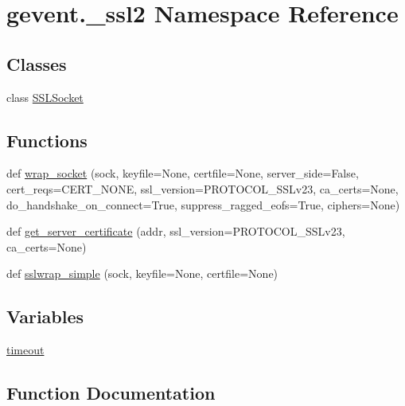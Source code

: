 \hypertarget{namespacegevent_1_1__ssl2}{}\section{gevent.\+\_\+ssl2 Namespace Reference}
\label{namespacegevent_1_1__ssl2}
\subsection*{Classes}
\begin{DoxyCompactItemize}
\item 
class \hyperlink{classgevent_1_1__ssl2_1_1_s_s_l_socket}{S\+S\+L\+Socket}
\end{DoxyCompactItemize}
\subsection*{Functions}
\begin{DoxyCompactItemize}
\item 
def \hyperlink{namespacegevent_1_1__ssl2_a448e3f7533be4db8be282f333c2d219d}{wrap\+\_\+socket} (sock, keyfile=None, certfile=None, server\+\_\+side=False, cert\+\_\+reqs=C\+E\+R\+T\+\_\+\+N\+O\+NE, ssl\+\_\+version=P\+R\+O\+T\+O\+C\+O\+L\+\_\+\+S\+S\+Lv23, ca\+\_\+certs=None, do\+\_\+handshake\+\_\+on\+\_\+connect=True, suppress\+\_\+ragged\+\_\+eofs=True, ciphers=None)
\item 
def \hyperlink{namespacegevent_1_1__ssl2_ab18006831d4481e988ad6e71c28f38d0}{get\+\_\+server\+\_\+certificate} (addr, ssl\+\_\+version=P\+R\+O\+T\+O\+C\+O\+L\+\_\+\+S\+S\+Lv23, ca\+\_\+certs=None)
\item 
def \hyperlink{namespacegevent_1_1__ssl2_a0ad7441640c76bee50fb20baedbb028f}{sslwrap\+\_\+simple} (sock, keyfile=None, certfile=None)
\end{DoxyCompactItemize}
\subsection*{Variables}
\begin{DoxyCompactItemize}
\item 
\hyperlink{namespacegevent_1_1__ssl2_ac56a33594c8daf3628f92051f1cf0c53}{timeout}
\end{DoxyCompactItemize}


\subsection{Function Documentation}
\mbox{\label{namespacegevent_1_1__ssl2_ab18006831d4481e988ad6e71c28f38d0}} 
